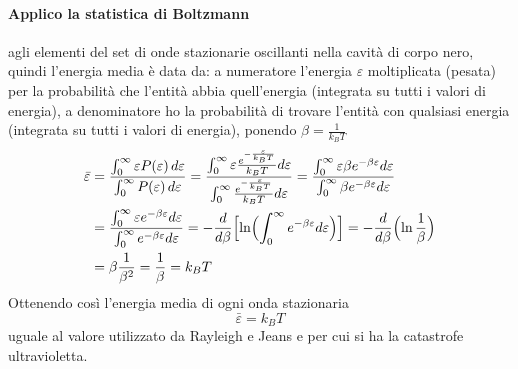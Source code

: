 \paragraph{Applico la statistica di Boltzmann} agli elementi del set di onde stazionarie oscillanti nella cavità di corpo nero, quindi l'energia media è data da: 
a numeratore l'energia $\varepsilon$ moltiplicata (pesata) per la probabilità che l'entità abbia quell'energia (integrata su tutti i valori di energia), a denominatore ho la probabilità di trovare l'entità con qualsiasi energia (integrata su tutti i valori di energia), ponendo $\beta=\frac{1}{k_BT}$
\begin{equation}
\begin{split}
\bar\varepsilon & =\frac{\int_{0}^{\infty} \varepsilon P(\varepsilon)\,d\varepsilon}{\int_{0}^{\infty} P(\varepsilon)\,d\varepsilon} 
= \frac{\int_{0}^{\infty} \varepsilon \frac{ e^{ - \frac{\varepsilon}{k_BT } } }{k_BT } d\varepsilon}{\int_{0}^{\infty} \frac{ e^{ - \frac{\varepsilon}{k_BT } } }{k_BT }d\varepsilon}
= \frac{\int_{0}^{\infty} \varepsilon \beta e^{ - \beta \varepsilon } d\varepsilon}{\int_{0}^{\infty} \beta e^{ - \beta \varepsilon } d\varepsilon} \\
& = \frac{\int_{0}^{\infty} \varepsilon e^{ - \beta \varepsilon } d\varepsilon}{\int_{0}^{\infty} e^{ - \beta \varepsilon } d\varepsilon}
= - \frac{ d}{d\beta } \Bigl[  \ln \Bigl(  \int_0^{\infty} e^{ -\beta \varepsilon } d\varepsilon  \Bigr)   \Bigr]
= - \frac{ d}{d\beta } \Bigl(  \ln \frac{ 1}{\beta }  \Bigr) \\
& = \beta \frac{ 1}{\beta^2 } 
= \frac{ 1}{\beta } 
= k_BT
\end{split}
\label{energia_media_blackbody}
\end{equation}
Ottenendo così l'energia media di ogni onda stazionaria 
\begin{equation}
\bar \varepsilon = k_B T
\end{equation}
uguale al valore utilizzato da Rayleigh e Jeans e per cui si ha la catastrofe ultravioletta.


